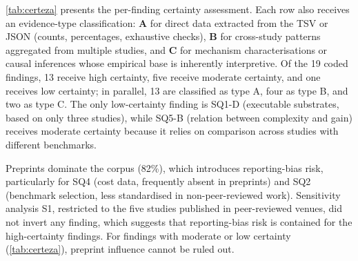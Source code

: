 \autoref{tab:certeza} presents the per-finding certainty assessment.
Each row also receives an evidence-type classification:
\textbf{A} for direct data extracted from the TSV or JSON (counts,
percentages, exhaustive checks), \textbf{B} for cross-study patterns
aggregated from multiple studies, and \textbf{C} for mechanism
characterisations or causal inferences whose empirical base is
inherently interpretive.
Of the 19 coded findings, 13 receive high certainty, five receive
moderate certainty, and one receives low certainty; in parallel, 13 are
classified as type A, four as type B, and two as type C.
The only low-certainty finding is SQ1-D (executable substrates, based
on only three studies), while SQ5-B (relation between complexity and
gain) receives moderate certainty because it relies on comparison
across studies with different benchmarks.

\FloatBarrier

Preprints dominate the corpus (82\%), which introduces reporting-bias
risk, particularly for SQ4 (cost data, frequently absent in preprints)
and SQ2 (benchmark selection, less standardised in non-peer-reviewed
work).
Sensitivity analysis S1, restricted to the five studies published in
peer-reviewed venues, did not invert any finding, which suggests that
reporting-bias risk is contained for the high-certainty findings.
For findings with moderate or low certainty (\autoref{tab:certeza}),
preprint influence cannot be ruled out.

\FloatBarrier

